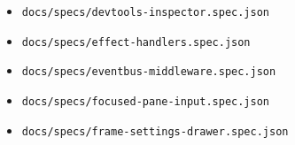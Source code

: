 \begin{itemize}
\item
  \texttt{d\allowbreak{}o\allowbreak{}c\allowbreak{}s\allowbreak{}/\allowbreak{}s\allowbreak{}p\allowbreak{}e\allowbreak{}c\allowbreak{}s\allowbreak{}/\allowbreak{}d\allowbreak{}e\allowbreak{}v\allowbreak{}t\allowbreak{}o\allowbreak{}o\allowbreak{}l\allowbreak{}s\allowbreak{}-\allowbreak{}i\allowbreak{}n\allowbreak{}s\allowbreak{}p\allowbreak{}e\allowbreak{}c\allowbreak{}t\allowbreak{}o\allowbreak{}r\allowbreak{}.\allowbreak{}s\allowbreak{}p\allowbreak{}e\allowbreak{}c\allowbreak{}.\allowbreak{}j\allowbreak{}s\allowbreak{}o\allowbreak{}n}
\item
  \texttt{d\allowbreak{}o\allowbreak{}c\allowbreak{}s\allowbreak{}/\allowbreak{}s\allowbreak{}p\allowbreak{}e\allowbreak{}c\allowbreak{}s\allowbreak{}/\allowbreak{}e\allowbreak{}f\allowbreak{}f\allowbreak{}e\allowbreak{}c\allowbreak{}t\allowbreak{}-\allowbreak{}h\allowbreak{}a\allowbreak{}n\allowbreak{}d\allowbreak{}l\allowbreak{}e\allowbreak{}r\allowbreak{}s\allowbreak{}.\allowbreak{}s\allowbreak{}p\allowbreak{}e\allowbreak{}c\allowbreak{}.\allowbreak{}j\allowbreak{}s\allowbreak{}o\allowbreak{}n}
\item
  \texttt{d\allowbreak{}o\allowbreak{}c\allowbreak{}s\allowbreak{}/\allowbreak{}s\allowbreak{}p\allowbreak{}e\allowbreak{}c\allowbreak{}s\allowbreak{}/\allowbreak{}e\allowbreak{}v\allowbreak{}e\allowbreak{}n\allowbreak{}t\allowbreak{}b\allowbreak{}u\allowbreak{}s\allowbreak{}-\allowbreak{}m\allowbreak{}i\allowbreak{}d\allowbreak{}d\allowbreak{}l\allowbreak{}e\allowbreak{}w\allowbreak{}a\allowbreak{}r\allowbreak{}e\allowbreak{}.\allowbreak{}s\allowbreak{}p\allowbreak{}e\allowbreak{}c\allowbreak{}.\allowbreak{}j\allowbreak{}s\allowbreak{}o\allowbreak{}n}
\item
  \texttt{d\allowbreak{}o\allowbreak{}c\allowbreak{}s\allowbreak{}/\allowbreak{}s\allowbreak{}p\allowbreak{}e\allowbreak{}c\allowbreak{}s\allowbreak{}/\allowbreak{}f\allowbreak{}o\allowbreak{}c\allowbreak{}u\allowbreak{}s\allowbreak{}e\allowbreak{}d\allowbreak{}-\allowbreak{}p\allowbreak{}a\allowbreak{}n\allowbreak{}e\allowbreak{}-\allowbreak{}i\allowbreak{}n\allowbreak{}p\allowbreak{}u\allowbreak{}t\allowbreak{}.\allowbreak{}s\allowbreak{}p\allowbreak{}e\allowbreak{}c\allowbreak{}.\allowbreak{}j\allowbreak{}s\allowbreak{}o\allowbreak{}n}
\item
  \texttt{d\allowbreak{}o\allowbreak{}c\allowbreak{}s\allowbreak{}/\allowbreak{}s\allowbreak{}p\allowbreak{}e\allowbreak{}c\allowbreak{}s\allowbreak{}/\allowbreak{}f\allowbreak{}r\allowbreak{}a\allowbreak{}m\allowbreak{}e\allowbreak{}-\allowbreak{}s\allowbreak{}e\allowbreak{}t\allowbreak{}t\allowbreak{}i\allowbreak{}n\allowbreak{}g\allowbreak{}s\allowbreak{}-\allowbreak{}d\allowbreak{}r\allowbreak{}a\allowbreak{}w\allowbreak{}e\allowbreak{}r\allowbreak{}.\allowbreak{}s\allowbreak{}p\allowbreak{}e\allowbreak{}c\allowbreak{}.\allowbreak{}j\allowbreak{}s\allowbreak{}o\allowbreak{}n}

\end{itemize}
